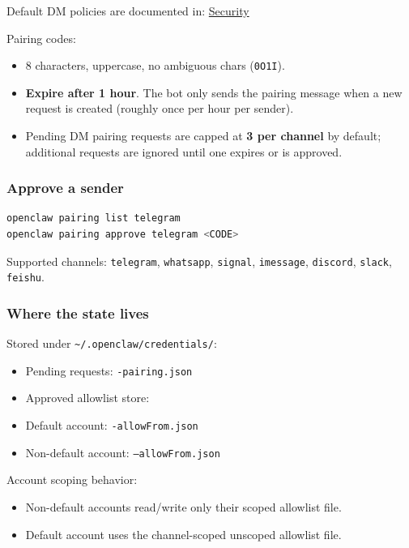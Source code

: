 Default DM policies are documented in: \href{/gateway/security}{Security}

Pairing codes:

\begin{itemize}
  \item 8 characters, uppercase, no ambiguous chars (\texttt{0O1I}).
  \item \textbf{Expire after 1 hour}. The bot only sends the pairing message when a new request is created (roughly once per hour per sender).
  \item Pending DM pairing requests are capped at \textbf{3 per channel} by default; additional requests are ignored until one expires or is approved.
\end{itemize}


\subsubsection{Approve a sender}


\begin{lstlisting}[language=bash]
openclaw pairing list telegram
openclaw pairing approve telegram <CODE>
\end{lstlisting}


Supported channels: \texttt{telegram}, \texttt{whatsapp}, \texttt{signal}, \texttt{imessage}, \texttt{discord}, \texttt{slack}, \texttt{feishu}.

\subsubsection{Where the state lives}


Stored under \texttt{\textasciitilde{}/.openclaw/credentials/}:

\begin{itemize}
  \item Pending requests: \texttt{-pairing.json}
  \item Approved allowlist store:
  \item Default account: \texttt{-allowFrom.json}
  \item Non-default account: \texttt{--allowFrom.json}
\end{itemize}


Account scoping behavior:

\begin{itemize}
  \item Non-default accounts read/write only their scoped allowlist file.
  \item Default account uses the channel-scoped unscoped allowlist file.
\end{itemize}


